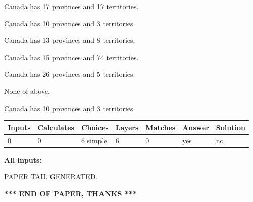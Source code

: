 \documentclass[12pt]{article}
\begin{document}
 
Canada has  17 provinces and  17 territories.
 
 
Canada has 10  provinces and 3 territories.
 
 
Canada has  13 provinces and  8 territories.
 
 
Canada has  15 provinces and  74 territories.
 
 
Canada has  26 provinces and  5 territories.
 
 
 None of above.
 
 
\noindent{}
 
 
Canada has 10  provinces and 3 territories.
 
 
\noindent{}
 
 
   
   
   
   
\noindent\begin{tabular}{|l|l|l|l|l|l|l|}
 \hline
Inputs & Calculates & Choices & Layers & Matches & Answer & Solution \\ \hline
 0  & 
 0  & 
 6
  simple  
  & 
 6  & 
 0  & 
  yes & 
  no 
  \\ \hline
 \end{tabular}
   
   
   
   
\noindent{}
   
   
   
   
\noindent\vspace{0.1in}\hspace{-0.08in} {\textbf{\Large{All inputs: }}}
   
   
   
   
   
   
 \vspace{0.2in}
 
   
   
\vspace{2.0in} PAPER TAIL GENERATED.
   
   
   
   
\vspace{1.0in} 
{\textbf{\large{ *** END OF PAPER, THANKS *** }}} 
   
\end{document}
